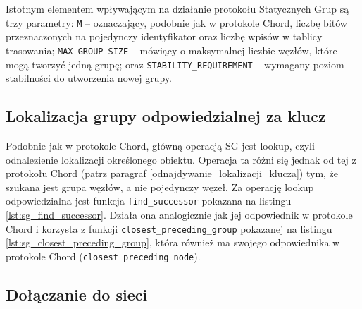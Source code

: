 \documentclass[12pt, twoside, openany]{report}
\begin{document}
Istotnym elementem wpływającym na działanie protokołu Statycznych Grup są trzy parametry: \texttt{M} -- oznaczający, podobnie jak w protokole Chord, liczbę bitów przeznaczonych na pojedynczy identyfikator oraz liczbę wpisów w tablicy trasowania; \texttt{MAX\_GROUP\_SIZE} -- mówiący o maksymalnej liczbie węzłów, które mogą tworzyć jedną grupę; oraz \texttt{STABILITY\_REQUIREMENT} -- wymagany poziom stabilności do utworzenia nowej grupy.

\subsection{Lokalizacja grupy odpowiedzialnej za klucz}

Podobnie jak w protokole Chord, główną operacją SG jest lookup, czyli odnalezienie lokalizacji określonego obiektu. Operacja ta różni się jednak od tej z protokołu Chord (patrz paragraf \ref{odnajdywanie_lokalizacji_klucza}) tym, że szukana jest grupa węzłów, a nie pojedynczy węzeł. Za operację lookup odpowiedzialna jest funkcja \texttt{find\_successor} pokazana na listingu \ref{lst:sg_find_successor}. Działa ona analogicznie jak jej odpowiednik w protokole Chord i korzysta z funkcji \texttt{closest\_preceding\_group} pokazanej na listingu \ref{lst:sg_closest_preceding_group}, która również ma swojego odpowiednika w protokole Chord (\texttt{closest\_preceding\_node}).





\subsection{Dołączanie do sieci}
\end{document}
